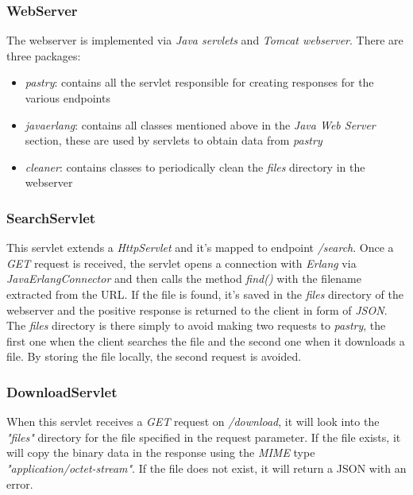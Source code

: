 \documentclass{article}
\begin{document}
\subsubsection{WebServer}

The webserver is implemented via \textit{Java servlets} and \textit{Tomcat webserver}. There are three packages:

\begin{itemize}
    \item \textit{pastry}: contains all the servlet responsible for creating responses for the various endpoints
    \item \textit{javaerlang}: contains all classes mentioned above in the \textit{Java Web Server} section, these are used by servlets to obtain data from \textit{pastry}
    \item \textit{cleaner}: contains classes to periodically clean the \textit{files} directory in the webserver
\end{itemize}

\subsubsection{SearchServlet}
This servlet extends a \textit{HttpServlet} and it's mapped to endpoint \textit{/search}. Once a \textit{GET} request is received, the servlet opens a connection with \textit{Erlang} via \textit{JavaErlangConnector} and then calls the method \textit{find()} with the filename extracted from the URL.
\newline
If the file is found, it's saved in the \textit{files} directory of the webserver and the positive response is returned to the client in form of \textit{JSON}. The \textit{files} directory is there simply to avoid making two requests to \textit{pastry}, the first one when the client searches the file and the second one when it downloads a file. By storing the file locally, the second request is avoided.

\subsubsection{DownloadServlet}
When this servlet receives a \textit{GET} request on \textit{/download}, it will look into the \textit{"files"} directory for the file specified in the request parameter. If the file exists, it will copy the binary data in the response using the \textit{MIME} type \textit{"application/octet-stream"}. If the file does not exist, it will return a JSON with an error.
\end{document}
